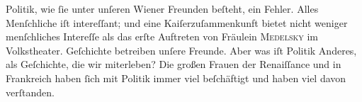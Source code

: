                Politik, wie{ }ſie unter unſeren Wiener Freunden
               beſteht, ein Fehler. Alles Menſchliche iſt intereſſant; und \strikeout{\textcolor{gray}{poli}} eine Kaiſerzuſammenkunft bietet nicht weniger
               menſchliches Intereſſe als das erſte Auftreten von Fräulein \textsc{Medelsky} im Volkstheater. Geſchichte betreiben
               unſere Freunde. Aber was iſt Politik Anderes, als Geſchichte, die wir miterleben? Die
               großen Frauen der Renaiſſance und in Frankreich
               haben{ }ſich mit Politik immer viel beſchäftigt und haben viel davon  verſtanden.\pend
           
